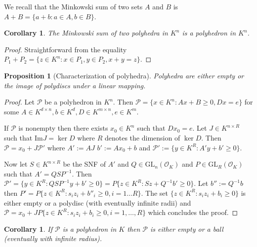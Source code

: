 \documentclass[a4paper,oneside,10pt]{article}
\newtheorem{proposition}[theorem]{Proposition}
\newtheorem{corollary}[theorem]{Corollary}
\newcommand{\GL}{\mathrm{GL}}
\begin{document}
We recall that the Minkowski sum of two sets $A$ and $B$ is $A+B = \{a+b : a \in A, b \in B\}$.

\begin{corollary}
The Minkowski sum of two polyhedra in $K^n$ is a polyhedron in $K^n$.
\end{corollary}
\begin{proof}
  Straightforward from the equality
  $P_1 + P_2 = \{z \in K^n : x \in P_1, y \in P_2, x+y=z\}.$
\end{proof}



\begin{proposition}[Characterization of polyhedra] \label{prop:carac}
    Polyhedra are either empty or the image of polydiscs under a linear mapping.
\end{proposition}
\begin{proof}
    Let $\mathcal{P}$ be a polyhedron in $K^n$. Then $\mathcal{P} = \{x \in K^n : Ax+B \ge 0, Dx = e\}$ for some $A \in K^{d \times n}, b \in K ^d,  D\in  K^{m\times n}, e \in K^m$.

    If $\mathcal{P}$ is nonempty then there exists $x_0 \in K^n$ such that $Dx_0=e$. Let $J \in K^{n \times R}$ such that $\textrm{Im} J = \ker D$ where $R$ denotes the dimension of $\ker D$. Then $\mathcal{P} = x_0 + J\mathcal{P}'$ where $A' := AJ$ $b' := Ax_0 + b$ and  $\mathcal{P'} := \{y \in K ^R: A'y + b' \ge 0 \}$.

    Now let $S \in K^{n\times R}$ be the SNF of $A'$ and $Q \in \GL_n\left(\mathcal{O}_K\right)$ and $P \in \GL_R\left(\mathcal{O}_K\right)$ such that $A'= Q S P^{-1}$.
    Then $\mathcal{P'} = \{y \in K^R : QSP^{-1}y + b' \ge  0\} = P\{z \in K^R : Sz + Q^{-1}b' \ge 0 \}$.
    Let $b'':=Q^{-1}b$ then $P' = P \{z \in K^R : s_i z_i + b''_i \ge 0, i= 1\ldots R\}$. The set $\{z \in K^R : s_i z_i + b_i \ge 0\}$ is either empty or a polydisc (with eventually infinite radii) and $\mathcal{P} = x_0 + JP \{z \in K^R: s_i z_i + b_i \ge  0, i=1,\ldots,R\}$ which concludes the proof.


\end{proof}

\begin{corollary} \label{cor:caracdim1}
   If $\mathcal{P}$ is a polyhedron in $K$ then $\mathcal{P}$ is either empty or a ball (eventually with infinite radius).
\end{corollary}
\end{document}
